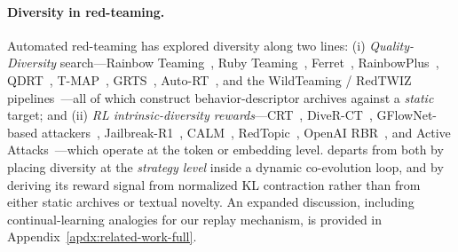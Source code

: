 \paragraph{Diversity in red-teaming.} Automated red-teaming has explored diversity along two lines: (i) \emph{Quality-Diversity} search---Rainbow Teaming~\citep{samvelyan2024rainbow}, Ruby Teaming~\citep{han2024ruby}, Ferret~\citep{pala2025ferret}, RainbowPlus~\citep{dang2025rainbowplus}, QDRT~\citep{wang2025qdrt}, T-MAP~\citep{guo2025tmap}, GRTS~\citep{grts2023}, Auto-RT~\citep{autort2025}, and the WildTeaming / RedTWIZ pipelines~\citep{jiang2024wildteaming,horal2025redtwiz}---all of which construct behavior-descriptor archives against a \emph{static} target; and (ii) \emph{RL intrinsic-diversity rewards}---CRT~\citep{hong2024curiosity}, DiveR-CT~\citep{zhao2025diverct}, GFlowNet-based attackers~\citep{lee2025gflownet}, Jailbreak-R1~\citep{wang2025jailbreakr1}, CALM~\citep{zheng2025calm}, RedTopic~\citep{redtopic2025}, OpenAI RBR~\citep{beutel2024openaidiverse}, and Active Attacks~\citep{activeattacks2025}---which operate at the token or embedding level. \method departs from both by placing diversity at the \emph{strategy level} inside a dynamic co-evolution loop, and by deriving its reward signal from normalized KL contraction rather than from either static archives or textual novelty. An expanded discussion, including continual-learning analogies for our replay mechanism, is provided in Appendix~\ref{apdx:related-work-full}.
